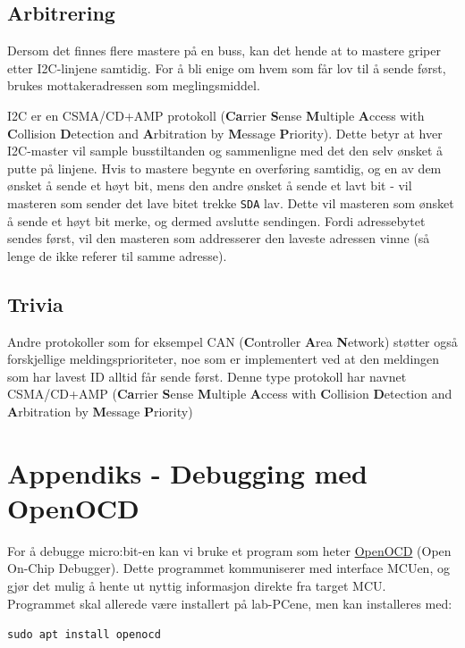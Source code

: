 \subsection*{Arbitrering}

Dersom det finnes flere mastere på en buss, kan det hende at to mastere griper etter I2C-linjene samtidig. For å bli enige om hvem som får lov til å sende først, brukes mottakeradressen som meglingsmiddel.

I2C er en CSMA/CD+AMP protokoll (\textbf{Ca}rrier \textbf{S}ense \textbf{M}ultiple \textbf{A}ccess
with \textbf{C}ollision \textbf{D}etection and \textbf{A}rbitration by \textbf{M}essage \textbf{P}riority). Dette betyr at hver I2C-master vil sample busstiltanden og sammenligne med det den selv ønsket å putte på linjene. Hvis to mastere begynte en overføring samtidig, og en av dem ønsket å sende et høyt bit, mens den andre ønsket å sende et lavt bit - vil masteren som sender det lave bitet trekke \verb|SDA| lav. Dette vil masteren som ønsket å sende et høyt bit merke, og dermed avslutte sendingen. Fordi adressebytet sendes først, vil den masteren som addresserer den laveste adressen vinne (så lenge de ikke referer til samme adresse).


\subsection*{Trivia}
Andre protokoller som for eksempel CAN (\textbf{C}ontroller \textbf{A}rea \textbf{N}etwork) støtter også forskjellige meldingsprioriteter, noe som er implementert ved at den meldingen som har lavest ID alltid får sende først. Denne type protokoll har navnet CSMA/CD+AMP (\textbf{Ca}rrier \textbf{S}ense \textbf{M}ultiple \textbf{A}ccess
with \textbf{C}ollision \textbf{D}etection and \textbf{A}rbitration by \textbf{M}essage \textbf{P}riority)

\cprotect\section{Appendiks - Debugging med OpenOCD}\label{app:Debugging}

For å debugge micro:bit-en kan vi bruke et program som heter \href{https://openocd.org/}{OpenOCD} (Open On-Chip Debugger). Dette programmet kommuniserer med interface MCUen, og gjør det mulig å hente ut nyttig informasjon direkte fra target MCU. Programmet skal allerede være installert på lab-PCene, men kan installeres med:

\verb|sudo apt install openocd|

